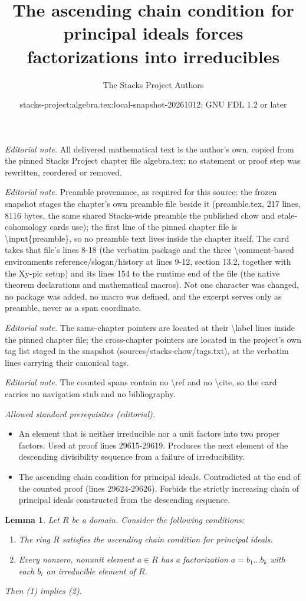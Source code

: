 \documentclass[10pt,a4paper]{amsart}
\title{The ascending chain condition for principal ideals forces factorizations into irreducibles}
\author{The Stacks Project Authors}
\date{stacks-project:algebra.tex:local-snapshot-20261012; GNU FDL 1.2 or later}
\theoremstyle{plain}
\newtheorem{lemma}[subsection]{Lemma}
\theoremstyle{definition}
\theoremstyle{remark}
\numberwithin{equation}{subsection}
\begin{document}
\maketitle
\noindent\textit{Editorial note.} All delivered mathematical text is the author's own, copied from the pinned Stacks Project chapter file algebra.tex; no statement or proof step was rewritten, reordered or removed.\par\medskip
\noindent\textit{Editorial note.} Preamble provenance, as required for this source: the frozen snapshot stages the chapter's own preamble file beside it (preamble.tex, 217 lines, 8116 bytes, the same shared Stacks-wide preamble the published chow and etale-cohomology cards use); the first line of the pinned chapter file is \textbackslash{}input\{preamble\}, so no preamble text lives inside the chapter itself. The card takes that file's lines 8-18 (the verbatim package and the three \textbackslash{}comment-based environments reference/slogan/history at lines 9-12, section 13.2, together with the Xy-pic setup) and its lines 154 to the runtime end of the file (the native theorem declarations and mathematical macros). Not one character was changed, no package was added, no macro was defined, and the excerpt serves only as preamble, never as a span coordinate.\par\medskip
\noindent\textit{Editorial note.} The same-chapter pointers are located at their \textbackslash{}label lines inside the pinned chapter file; the cross-chapter pointers are located in the project's own tag list staged in the snapshot (sources/stacks-chow/tags.txt), at the verbatim lines carrying their canonical tags.\par\medskip
\noindent\textit{Editorial note.} The counted spans contain no \textbackslash{}ref and no \textbackslash{}cite, so the card carries no navigation stub and no bibliography.\par\medskip
\noindent\textit{Allowed standard prerequisites (editorial).}\begin{itemize}
\item An element that is neither irreducible nor a unit factors into two proper factors. Used at proof lines 29615-29619. Produces the next element of the descending divisibility sequence from a failure of irreducibility.
\item The ascending chain condition for principal ideals. Contradicted at the end of the counted proof (lines 29624-29626). Forbids the strictly increasing chain of principal ideals constructed from the descending sequence.
\end{itemize}\medskip
\begin{lemma}
\label{lemma-factorization-exists}
Let $R$ be a domain. Consider the following conditions:
\begin{enumerate}
\item The ring $R$ satisfies the ascending chain condition for
principal ideals.
\item Every nonzero, nonunit element $a \in R$
has a factorization $a = b_1 \ldots b_k$
with each $b_i$ an irreducible element of $R$.
\end{enumerate}
Then (1) implies (2).
\end{lemma}
\end{document}
